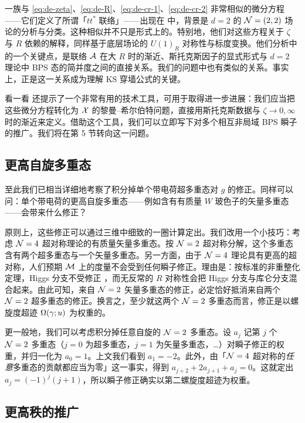一族与 \eqref{eq:de-zeta}、\eqref{eq:de-R}、\eqref{eq:de-cr-1}、\eqref{eq:de-cr-2} 非常相似的微分方程——它们定义了所谓「$tt^*$ 联络」——出现在 \cite{Cecotti:1993rm,MR1213301} 中，背景是 $d=2$ 的 $\mathcal{N}=(2,2)$ 场论的分析与分类。这种相似并不只是形式上的。特别地，他们对这些方程关于 $\zeta$ 与 $R$ 依赖的解释，同样基于底层场论的 $U(1)_R$ 对称性与标度变换。他们分析中的一个关键点，是联络 $\mathcal{A}$ 在大 $R$ 时的渐近、斯托克斯因子的显式形式与 $d=2$ 理论中 BPS 态的简并度之间的直接关系。我们的问题中也有类似的关系。事实上，正是这一关系成为理解 KS 穿墙公式的关键。

看一看 \cite{Cecotti:1993rm,MR1213301} 还提示了一个非常有用的技术工具，可用于取得进一步进展：我们应当把这些微分方程转化为 $\mathcal{X}$ 的黎曼–希尔伯特问题，直接用斯托克斯数据与 $\zeta \to 0, \infty$ 时的渐近来定义。借助这个工具，我们可以立即写下对多个相互非局域 BPS 瞬子的推广。我们将在第 5 节转向这一问题。%

\subsection{更高自旋多重态}

至此我们已相当详细地考察了积分掉单个带电荷超多重态对 $g$ 的修正。同样可以问：单个带电荷的更高自旋多重态——例如含有有质量 $W$ 玻色子的矢量多重态——会带来什么修正？

原则上，这些修正可以通过三维中细致的一圈计算定出。我们改用一个小技巧：考虑 $\mathcal{N}=4$ 超对称理论的有质量矢量多重态。按 $\mathcal{N}=2$ 超对称分解，这个多重态含有两个超多重态与一个矢量多重态。另一方面，由于 $\mathcal{N}=4$ 理论具有更高的超对称，人们预期 $\mathcal{M}$ 上的度量不会受到任何瞬子修正。理由是：按标准的非重整化定理，Higgs 分支不受修正 \cite{Argyres:1996eh}，而无反常的 $R$ 对称性会把 Higgs 分支与库仑分支混合起来。由此可知，来自 $\mathcal{N}=2$ 矢量多重态的修正，必定恰好抵消来自两个 $\mathcal{N}=2$ 超多重态的修正。换言之，至少就这两个 $\mathcal{N}=2$ 多重态而言，修正是以螺旋度超迹 $\Omega(\gamma;u)$ 为权重的。

更一般地，我们可以考虑积分掉任意自旋的 $\mathcal{N}=2$ 多重态。设 $a_j$ 记第 $j$ 个 $\mathcal{N}=2$ 多重态（$j=0$ 为超多重态，$j=1$ 为矢量多重态，\dots）对瞬子修正的权重，并归一化为 $a_0 = 1$。上文我们看到 $a_1 = -2$。此外，由「$\mathcal{N}=4$ 超对称的\emph{任意}多重态的贡献都应当为零」这一事实，得到 $a_{j+2} + 2 a_{j+1} + a_j = 0$。这就定出 $a_j = (-1)^j (j+1)$，所以瞬子修正确实以第二螺旋度超迹为权重。

\subsection{更高秩的推广}
\label{sec:higher-rank}

